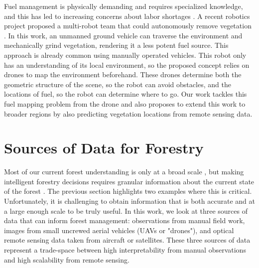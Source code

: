Fuel management is physically demanding and requires specialized knowledge, and this has led to increasing concerns about labor shortages \cite{CommisionGlobalDivision}. 
A recent robotics project proposed a multi-robot team that could autonomously remove vegetation \cite{couceiro2019semfire}. In this work, an unmanned ground vehicle can traverse the environment and mechanically grind vegetation, rendering it a less potent fuel source. This approach is already common using manually operated vehicles. This robot only has an understanding of its local environment, so the proposed concept relies on drones to map the environment beforehand. These drones determine both the geometric structure of the scene, so the robot can avoid obstacles, and the locations of fuel, so the robot can determine where to go. Our work tackles this fuel mapping problem from the drone and also proposes to extend this work to broader regions by also predicting vegetation locations from remote sensing data. 


\section{Sources of Data for Forestry}
Most of our current forest understanding is only at a broad scale \cite{Oswalt2014Update:}, but making intelligent forestry decisions requires granular information about the current state of the forest \cite{digitalForestry2009, Hogland2014EstimatingArcObjects}. The previous section highlights two examples where this is critical. Unfortunately, it is challenging to obtain information that is both accurate and at a large enough scale to be truly useful. In this work, we look at three sources of data that can inform forest management: observations from manual field work, images from small uncrewed aerial vehicles (UAVs or "drones"), and optical remote sensing data taken from aircraft or satellites. These three sources of data represent a trade-space between high interpretability from manual observations and high scalability from remote sensing.

